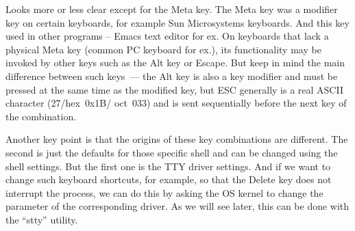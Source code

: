 \documentclass[12pt]{report}
\begin{document}
\medskip
Looks more or less clear except for the Meta key. The Meta key was a modifier
key on certain keyboards, for example Sun Microsystems keyboards. And this key
used in other programs -- Emacs text editor for ex. On keyboards that lack
a physical Meta key (common PC keyboard for ex.), its functionality may be
invoked by other keys such as the Alt key or Escape. But keep in mind the main
difference between such keys~--- the Alt key is also a key modifier and must be
pressed at the same time as the modified key, but ESC generally is
a real ASCII character (\mbox{27}/\mbox{hex 0x1B}/ \mbox{oct 033}) and is
sent sequentially before the next key of the combination.

\medskip
Another key point is that the origins of these key combinations are different.
The second is just the defaults for those specific shell and can be changed
using the shell settings. But the first one is the TTY driver settings.
And if we want to change such keyboard shortcuts, for example, so that
the Delete key does not interrupt the process, we can do this by asking
the OS kernel to change the parameter of the corresponding driver.
As we will see later, this can be done with the ``stty'' utility.
\end{document}
